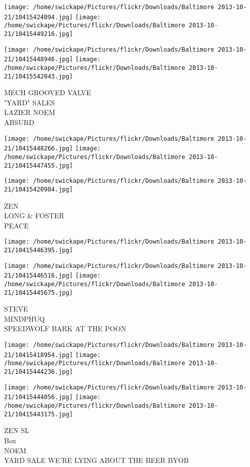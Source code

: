 \documentclass[10pt,letterpaper]{article}
\begin{document}
\texttt{[image: /home/swickape/Pictures/flickr/Downloads/Baltimore 2013-10-21/10415424094.jpg]}
\texttt{[image: /home/swickape/Pictures/flickr/Downloads/Baltimore 2013-10-21/10415449216.jpg]}

\texttt{[image: /home/swickape/Pictures/flickr/Downloads/Baltimore 2013-10-21/10415448946.jpg]}
\texttt{[image: /home/swickape/Pictures/flickr/Downloads/Baltimore 2013-10-21/10415542043.jpg]}

MECH GROOVED VALVE\\
"YARD" SALES\\
LAZIER NOEM\\
ABSURD
\pagebreak

\texttt{[image: /home/swickape/Pictures/flickr/Downloads/Baltimore 2013-10-21/10415448266.jpg]}
\texttt{[image: /home/swickape/Pictures/flickr/Downloads/Baltimore 2013-10-21/10415447455.jpg]}

\texttt{[image: /home/swickape/Pictures/flickr/Downloads/Baltimore 2013-10-21/10415420984.jpg]}

ZEN\\
LONG \& FOSTER\\
PEACE
\pagebreak

\texttt{[image: /home/swickape/Pictures/flickr/Downloads/Baltimore 2013-10-21/10415446395.jpg]}

\vspace{0.25in}
\texttt{[image: /home/swickape/Pictures/flickr/Downloads/Baltimore 2013-10-21/10415446516.jpg]}
\texttt{[image: /home/swickape/Pictures/flickr/Downloads/Baltimore 2013-10-21/10415445675.jpg]}

STEVE\\
MINDPHUQ\\
SPEEDWOLF BARK AT THE POON
\pagebreak

\texttt{[image: /home/swickape/Pictures/flickr/Downloads/Baltimore 2013-10-21/10415418954.jpg]}
\texttt{[image: /home/swickape/Pictures/flickr/Downloads/Baltimore 2013-10-21/10415444236.jpg]}

\texttt{[image: /home/swickape/Pictures/flickr/Downloads/Baltimore 2013-10-21/10415444056.jpg]}
\texttt{[image: /home/swickape/Pictures/flickr/Downloads/Baltimore 2013-10-21/10415443175.jpg]}

ZEN SL\\
Box\\
NOEM\\
YARD SALE WE'RE LYING ABOUT THE BEER BYOB
\pagebreak
\end{document}
